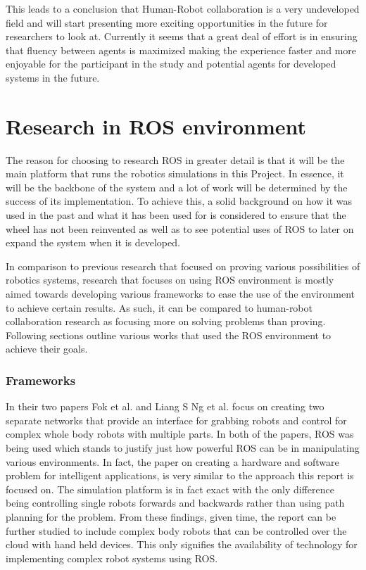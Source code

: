 \documentclass{report}
\begin{document}
        This leads to a conclusion that Human-Robot collaboration is a very undeveloped field and will start presenting more exciting opportunities in the future for researchers to look at. Currently it seems that a great deal of effort is in ensuring that fluency between agents is maximized making the experience faster and more enjoyable for the participant in the study and potential agents for developed systems in the future.
    
    \section{Research in ROS environment}
        The reason for choosing to research ROS in greater detail is that it will be the main platform that runs the robotics simulations in this Project. In essence, it will be the backbone of the system and a lot of work will be determined by the success of its implementation. To achieve this, a solid background on how it was used in the past and what it has been used for is considered to ensure that the wheel has not been reinvented as well as to see potential uses of ROS to later on expand the system when it is developed.

        In comparison to previous research that focused on proving various possibilities of robotics systems, research that focuses on using ROS environment is mostly aimed towards developing various frameworks to ease the use of the environment to achieve certain results. As such, it can be compared to human-robot collaboration research as focusing more on solving problems than proving. Following sections outline various works that used the ROS environment to achieve their goals.

      \subsubsection{Frameworks}
        In their two papers Fok et al.\cite{ChienLiang} and Liang S Ng et al.\cite{Liang} focus on creating two separate networks that provide an interface for grabbing robots and control for complex whole body robots with multiple parts. In both of the papers, ROS was being used which stands to justify just how powerful ROS can be in manipulating various environments. In fact, the paper on creating a hardware and software problem for intelligent applications, is very similar to the approach this report is focused on. The simulation platform is in fact exact with the only difference being controlling single robots forwards and backwards rather than using path planning for the problem. From these findings, given time, the report can be further studied to include complex body robots that can be controlled over the cloud with hand held devices. This only signifies the availability of technology for implementing complex robot systems using ROS.
\end{document}
